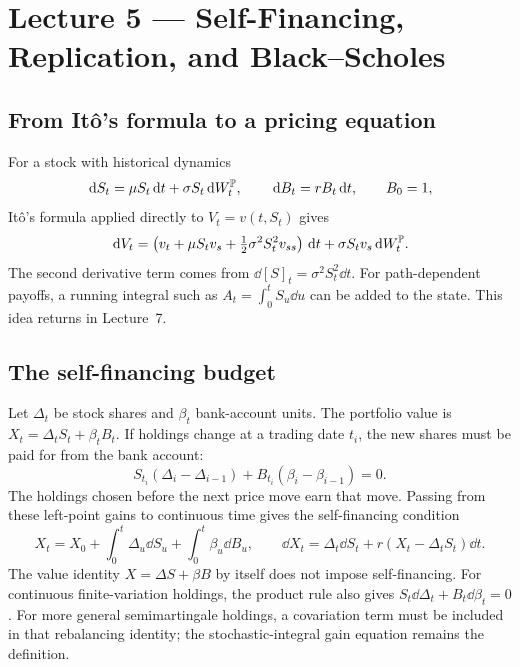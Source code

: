 
\section{Lecture 5 --- Self-Financing, Replication, and Black--Scholes}


\subsection{From It\^o's formula to a pricing equation}

For a stock with historical dynamics
\[
\,\mathrm{d} S_t=\mu S_t\,\mathrm{d} t+\sigma S_t\,\mathrm{d} W_t^{\mathbb{P}},
\qquad
\,\mathrm{d} B_t=rB_t\,\mathrm{d} t,\qquad B_0=1,
\]
It\^o's formula applied directly to \(V_t=v(t,S_t)\) gives
\[
\,\mathrm{d} V_t
=\left(v_t+\mu S_tv_s+\tfrac12\sigma^2S_t^2v_{ss}\right)\,\mathrm{d} t
+\sigma S_tv_s\,\mathrm{d} W_t^{\mathbb{P}}.
\]
The second derivative term comes from \(\dd[S]_t=\sigma^2S_t^2\dd t\).
For path-dependent payoffs, a running integral such as
\(A_t=\int_0^tS_u\dd u\) can be added to the state. This idea returns in
Lecture~7.

\subsection{The self-financing budget}

Let \(\Delta_t\) be stock shares and \(\beta_t\) bank-account units. The
portfolio value is \(X_t=\Delta_tS_t+\beta_tB_t\). If holdings change at
a trading date \(t_i\), the new shares must be paid for from the bank
account:
\[
S_{t_i}(\Delta_i-\Delta_{i-1})
+B_{t_i}(\beta_i-\beta_{i-1})=0.
\]
The holdings chosen before the next price move earn that move. Passing
from these left-point gains to continuous time gives the
self-financing condition
\[
\boxed{
X_t=X_0+\int_0^t\Delta_u\dd S_u+\int_0^t\beta_u\dd B_u,
\qquad
\dd X_t=\Delta_t\dd S_t+r(X_t-\Delta_tS_t)\dd t.}
\]
The value identity \(X=\Delta S+\beta B\) by itself does not impose
self-financing. For continuous finite-variation holdings, the product rule
also gives \(S_t\dd\Delta_t+B_t\dd\beta_t=0\). For more general
semimartingale holdings, a covariation term must be included in that
rebalancing identity; the stochastic-integral gain equation remains the
definition.

